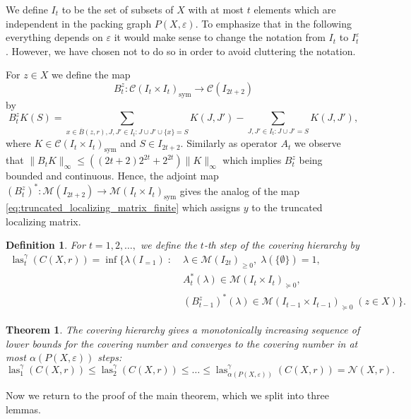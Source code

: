 \documentclass{amsart}
\newtheorem{theorem}[defin]{Theorem}
\newtheorem{definition}[defin]{Definition}
\DeclareMathOperator{\las}{las}
\DeclareMathOperator{\sym}{sym}
\begin{document}
We define $I_t$ to be the set of subsets of $X$ with at
most $t$ elements which are independent in the packing graph $P(X,\varepsilon)$.
To emphasize that in the following everything depends on $\varepsilon$ it would make sense to change the notation from $I_t$ to $I^{\varepsilon}_t$. However, we have chosen not to do so in order to avoid cluttering the notation.

\smallskip

For $z \in X$ we define the map
\[
  B^z_t : \mathcal{C}(I_t \times I_t)_{\sym} \to \mathcal{C}(I_{2t+2})
\]
by
\[
  B^z_t K(S) = \sum_{x \in \overline{B}(z,r), J, J'\in I_t : J \cup J' \cup
    \{x\} = S} K(J,J')
  - \sum_{J,J' \in I_t : J \cup J' = S} K(J,J'),
\]
where $K \in \mathcal{C}(I_t \times I_t)_{\sym}$ and $S \in I_{2t+2}$. Similarly as operator $A_t$ we observe that 
$\|B_t K \|_\infty \leq ((2t+2) 2^{2t} + 2^{2t}) \|K\|_\infty$ which implies $B_t^z$ being bounded and continuous. Hence, the adjoint map
$(B^z_t)^* : \mathcal{M}(I_{2t+2}) \to \mathcal{M}(I_t \times
I_t)_{\sym}$ gives the analog of the map \eqref{eq:truncated_localizing_matrix_finite} which assigns $y$ to the truncated localizing matrix.

\begin{definition}
  For $t = 1, 2, \ldots, $ we define the $t$-th step of the \emph{covering
  hierarchy} by
\[
\begin{split}
\las^\gamma_t(C(X,r)) = \inf\Big\{\lambda(I_{=1})   \; : \; & \lambda \in \mathcal{M}(I_{2t})_{\geq 0}, \;
\lambda(\{\emptyset\}) = 1,\\
& A_t^*(\lambda) \in \mathcal{M}(I_t \times I_t)_{\succeq 0}, \\
& (B^z_{t-1})^*(\lambda) \in  \mathcal{M}(I_{t-1} \times
I_{t-1})_{\succeq 0} \; (z \in X) \Big\}.
\end{split}
\]
\end{definition}

\begin{theorem}
 \label{thm:main}
The covering hierarchy gives a monotonically increasing sequence of
lower bounds for the covering number and converges to the covering
number in at most $\alpha(P(X,\varepsilon))$ steps:
\[
\las^\gamma_1(C(X,r)) \leq \las^\gamma_2(C(X,r)) \leq \ldots
\leq \las^\gamma_{\alpha(P(X,\varepsilon))}(C(X,r)) =
\mathcal{N}(X,r).
\]
\end{theorem}

\medskip

Now we return to the proof of the main theorem, which we split into three lemmas.
\end{document}
